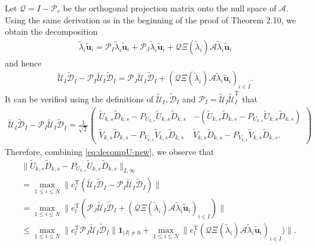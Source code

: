 \documentclass[reqno]{amsart}
\newcommand{\T}{\mathrm{T}}
\theoremstyle{plain}
\theoremstyle{definition}
\begin{document}
Let $\mathcal Q=I-\mathcal P_r$ be the orthogonal projection matrix onto the null space of $\mathcal A$. Using the same derivation as in the beginning of the proof of Theorem  2.10, we obtain the decomposition
\begin{align*}
\widetilde \lambda_i \widetilde{\mathbf u}_i =\mathcal P_I \widetilde \lambda_i \widetilde{\mathbf u}_i + \mathcal P_J \widetilde \lambda_i \widetilde{\mathbf u}_i +  \mathcal Q \Xi(\widetilde \lambda_i) \mathcal A \widetilde \lambda_i \widetilde{\mathbf u}_i
\end{align*}
and hence
\begin{align}\label{eq:decompU-new}
\widetilde{\mathcal U}_I \widetilde{\mathcal D}_I- \mathcal P_I \widetilde{\mathcal U}_I \widetilde{\mathcal D}_I= \mathcal P_J \widetilde{\mathcal U}_I \widetilde{\mathcal D}_I + (\mathcal Q \Xi(\widetilde \lambda_i) \mathcal A \widetilde \lambda_i \widetilde{\mathbf u}_i)_{i\in I}.
\end{align}
It can be verified using the definitions of $\widetilde{\mathcal U}_I, \widetilde{\mathcal D}_I$ and $\mathcal P_I = \widetilde{\mathcal U}_I \widetilde{\mathcal U}_I^\T$ that
\begin{align*}
\widetilde{\mathcal U}_I \widetilde{\mathcal D}_I- \mathcal P_I \widetilde{\mathcal U}_I \widetilde{\mathcal D}_I=\frac{1}{\sqrt 2}
\begin{pmatrix}
\widetilde U_{k,s} \widetilde D_{k,s} - P_{U_{k,s}} \widetilde U_{k,s} \widetilde D_{k,s} & -(\widetilde U_{k,s} \widetilde D_{k,s} - P_{U_{k,s}} \widetilde U_{k,s} \widetilde D_{k,s})\\
\widetilde V_{k,s} \widetilde D_{k,s} - P_{V_{k,s}} \widetilde V_{k,s} \widetilde D_{k,s} & \widetilde V_{k,s} \widetilde D_{k,s} - P_{V_{k,s}} \widetilde V_{k,s} \widetilde D_{k,s}.
\end{pmatrix}
\end{align*}
Therefore, combining \eqref{eq:decompU-new}, we observe that
\begin{align}\label{eq:wtbd}
&\|\widetilde U_{k,s} \widetilde D_{k,s} - P_{U_{k,s}} \widetilde U_{k,s} \widetilde D_{k,s}\|_{2,\infty} \nonumber\\&= \max_{1\le i \le N} \| e_l^\T (\widetilde{\mathcal U}_I \widetilde{\mathcal D}_I- \mathcal P_I \widetilde{\mathcal U}_I \widetilde{\mathcal D}_I)\| \nonumber\\
&= \max_{1\le i \le N} \| e_l^\T (\mathcal P_J \widetilde{\mathcal U}_I \widetilde{\mathcal D}_I + (\mathcal Q \Xi(\widetilde \lambda_i) \mathcal A \widetilde \lambda_i \widetilde{\mathbf u}_i)_{i\in I})\| \nonumber\\
&\le \max_{1\le i \le N} \| e_l^\T \mathcal P_J \widetilde{\mathcal U}_I \widetilde{\mathcal D}_I \| \mathbf{1}_{|J| \neq 0}+ \max_{1\le i \le N} \| e_l^\T (\mathcal Q \Xi(\widetilde \lambda_i) \mathcal A \widetilde \lambda_i \widetilde{\mathbf u}_i)_{i\in I})\|.
\end{align}
\end{document}
